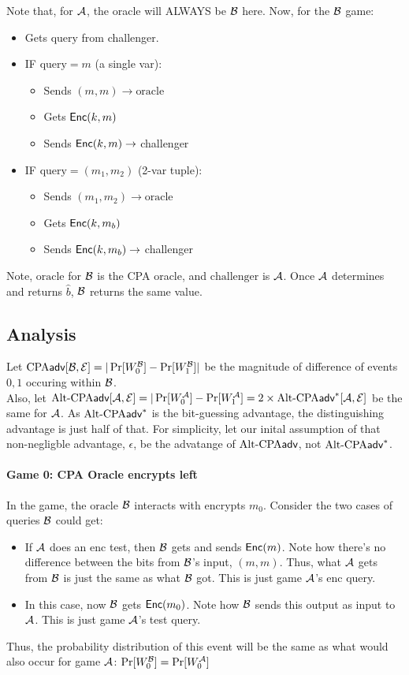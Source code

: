 \documentclass[12pt]{article}
\theoremstyle{plain}
\theoremstyle{definition}
\begin{document}
\begin{solution}
\noindent Note that, for $\mathcal{A}$, the oracle will ALWAYS be $\mathcal{B}$ here. Now, for the $\mathcal{B}$ game:
\begin{itemize}
  \item Gets $\text{query}$ from challenger.
  \item IF $\text{query} = m$ (a single var):
  \begin{itemize}
    \item Sends $(m, m) \to \text{oracle}$
    \item Gets $\textsf{\upshape Enc}(k, m)$
    \item Sends $\textsf{\upshape Enc}(k, m) \to$ challenger
  \end{itemize}
  \item IF $\text{query} = (m_1, m_2)$ (2-var tuple):
  \begin{itemize}
    \item Sends $(m_1, m_2) \to \text{oracle}$
    \item Gets $\textsf{\upshape Enc}(k, m_b)$
    \item Sends $\textsf{\upshape Enc}(k, m_b) \to$ challenger
  \end{itemize}
\end{itemize}

\noindent Note, $\text{oracle}$ for $\mathcal{B}$ is the CPA oracle, and $\text{challenger}$ is $\mathcal{A}$. Once $\mathcal{A}$ determines and returns $\hat{b}$, $\mathcal{B}$ returns the same value.

\subsection*{Analysis}
Let $\textrm{CPA}\textsf{adv}[\mathcal{B}, \mathcal{E}] = |\Pr[W^{\mathcal{B}}_0] - \Pr[W^{\mathcal{B}}_1]|$ be the magnitude of difference of events $0, 1$ occuring within $\mathcal{B}$. \\

\noindent Also, let $\textrm{Alt-CPA}\textsf{adv}[\mathcal{A}, \mathcal{E}] = |\Pr[W^{\mathcal{A}}_0] - \Pr[W^{\mathcal{A}}_1] = 2 \times \textrm{Alt-CPA}\textsf{adv}^*[\mathcal{A}, \mathcal{E}]$ be the same for $\mathcal{A}$. As $\textrm{Alt-CPA}\textsf{adv}^*$ is the bit-guessing advantage,
the distinguishing advantage is just half of that. For simplicity, let our inital assumption of that non-negligble advantage, $\epsilon$, be the advatange of
$\textrm{Alt-CPA}\textsf{adv}$, not $\textrm{Alt-CPA}\textsf{adv}^*$.

\paragraph{Game 0: CPA Oracle encrypts left} In the game, the $\text{oracle}$ $\mathcal{B}$ interacts with encrypts $m_0$. Consider the two cases of queries $\mathcal{B}$ could get:
\begin{itemize}
  \item[$m$] If $\mathcal{A}$ does an enc test, then $\mathcal{B}$ gets and sends $\textsf{\upshape Enc}(m)$. Note how there's no difference between the bits from $\mathcal{B}$'s input, $(m, m)$. Thus, what $\mathcal{A}$
  gets from $\mathcal{B}$ is just the same as what $\mathcal{B}$ got. This is just game $\mathcal{A}$'s enc query.
  \item[$(m, m)$] In this case, now $\mathcal{B}$ gets $\textsf{\upshape Enc}(m_0)$. Note how $\mathcal{B}$ sends this output as input to $\mathcal{A}$. This is just game $\mathcal{A}$'s test query.
\end{itemize}
\noindent Thus, the probability distribution of this event will be the same as what would also occur for game $\mathcal{A}$: $\Pr[W^{\mathcal{B}}_0] = \Pr[W^{\mathcal{A}}_0]$


\end{solution}
\end{document}
